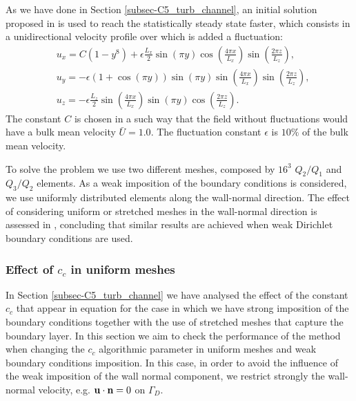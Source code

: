 As we have done in Section \ref{subsec-C5_turb_channel}, an initial solution proposed in \cite{moin_numerical_1980} is used to reach the statistically steady state faster, which consists in a unidirectional velocity profile over which is added a fluctuation:
\begin{align}
\label{eq-C7_TCF_initial_sol}
&u_x = C\left(1-y^8\right)+\epsilon\frac{L_x}{2}\sin(\pi y)\cos\left(\frac{4\pi x}{L_x}\right)\sin\left(\frac{2\pi z}{L_z}\right),\\\nonumber
&u_y = -\epsilon(1+\cos(\pi y))\sin(\pi y)\sin\left(\frac{4\pi x}{L_x}\right)\sin\left(\frac{2\pi z}{L_z}\right),\\
&u_z = -\epsilon\frac{L_z}{2}\sin\left(\frac{4\pi x}{L_x}\right)\sin(\pi y)\cos\left(\frac{2\pi z}{L_z}\right).\nonumber
\end{align}
The constant $C$ is chosen in a such way that the field without fluctuations would have a bulk mean velocity $\bar{U}=1.0$. The fluctuation constant $\epsilon$ is $10\%$ of the bulk mean velocity.

To solve the problem we use two different meshes, composed by $ 16^3 $ $ Q_2/Q_1 $ and $ Q_3/Q_2 $ elements. As a weak imposition of the boundary conditions is considered, we use uniformly distributed elements along the wall-normal direction. The effect of considering uniform or stretched meshes in the wall-normal direction is assessed in \cite{bazilevs_weak_2007}, concluding that similar results are achieved when weak Dirichlet boundary conditions are used.

%
\subsubsection{Effect of $ c_c $ in uniform meshes}
In Section \ref{subsec-C5_turb_channel} we have analysed the effect of the constant $ c_c $ that appear in equation  for the case in which we have strong imposition of the boundary conditions together with the use of stretched meshes that capture the boundary layer. In this section we aim to check the performance of the method when changing the $ c_c $ algorithmic parameter in uniform meshes and weak boundary conditions imposition. In this case, in order to avoid the influence of the weak imposition of the wall normal component, we restrict strongly the wall-normal velocity, e.g. $ {\bf u}\cdot{\bf n}=0 $ on $ \Gamma_D $.

